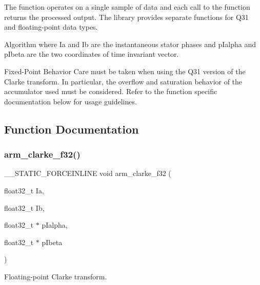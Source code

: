 The function operates on a single sample of data and each call to the function returns the processed output. The library provides separate functions for Q31 and floating-\/point data types. \begin{DoxyParagraph}{Algorithm}
 where {\ttfamily Ia} and {\ttfamily Ib} are the instantaneous stator phases and {\ttfamily p\+Ialpha} and {\ttfamily p\+Ibeta} are the two coordinates of time invariant vector. 
\end{DoxyParagraph}
\begin{DoxyParagraph}{Fixed-\/\+Point Behavior}
Care must be taken when using the Q31 version of the Clarke transform. In particular, the overflow and saturation behavior of the accumulator used must be considered. Refer to the function specific documentation below for usage guidelines. 
\end{DoxyParagraph}


\subsection{Function Documentation}
\mbox{\label{group__clarke_ga82d40c62bb48ef4d613f1f2f685b4084}} 
\subsubsection{\texorpdfstring{arm\_clarke\_f32()}{arm\_clarke\_f32()}}
{\footnotesize\ttfamily \+\_\+\+\_\+\+S\+T\+A\+T\+I\+C\+\_\+\+F\+O\+R\+C\+E\+I\+N\+L\+I\+NE void arm\+\_\+clarke\+\_\+f32 (\begin{DoxyParamCaption}\item[{float32\+\_\+t}]{Ia,  }\item[{float32\+\_\+t}]{Ib,  }\item[{float32\+\_\+t $\ast$}]{p\+Ialpha,  }\item[{float32\+\_\+t $\ast$}]{p\+Ibeta }\end{DoxyParamCaption})}



Floating-\/point Clarke transform. 


